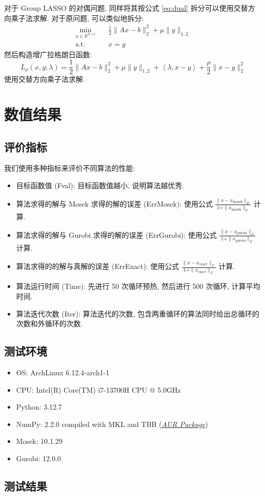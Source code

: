 \documentclass{article}
\begin{document}
对于 Group LASSO 的对偶问题, 同样将其按公式 \ref{eq:dual} 拆分可以使用交替方向乘子法求解. 对于原问题, 可以类似地拆分:
\begin{equation*}
    \begin{aligned}
        \min_{x \in \mathbb{R}^{n\times l}}\quad &\frac{1}{2} \|Ax - b\|_2^2 +
        \mu \|y\|_{1,2}\\
        \text{s.t.}\quad & x=y
    \end{aligned}
\end{equation*}
然后构造增广拉格朗日函数:
\begin{equation*}
    L_\rho(x, y; \lambda) = \frac{1}{2} \|Ax - b\|_2^2 + \mu \|y\|_{1,2} + \left<\lambda, x - y\right> + \frac{\rho}{2}\|x - y\|_2^2
\end{equation*}
使用交替方向乘子法求解.

\section{数值结果}

\subsection{评价指标}
我们使用多种指标来评价不同算法的性能:
\begin{itemize}
    \item 目标函数值 (Fval): 目标函数值越小, 说明算法越优秀.
    \item 算法求得的解与 Mosek 求得的解的误差 (ErrMosek): 使用公式 $\frac{\|x - x_{\text{mosek}}\|_F}{1+\|x_{\text{mosek}}\|_F}$ 计算.
    \item 算法求得的解与 Gurobi 求得的解的误差 (ErrGurobi): 使用公式 $\frac{\|x - x_{\text{gurobi}}\|_F}{1+\|x_{\text{gurobi}}\|_F}$ 计算.
    \item 算法求得的的解与真解的误差 (ErrExact): 使用公式 $\frac{\|x - x_{\text{exact}}\|_F}{1+\|x_{\text{exact}}\|_F}$ 计算.
    \item 算法运行时间 (Time): 先进行 50 次循环预热, 然后进行 500 次循环, 计算平均时间.
    \item 算法迭代次数 (Iter): 算法迭代的次数, 包含两重循环的算法同时给出总循环的次数和外循环的次数.
\end{itemize}

\subsection{测试环境}

\begin{itemize}
    \item OS: ArchLinux 6.12.4-arch1-1
    \item CPU: Intel(R) Core(TM) i7-13700H CPU @ 5.0GHz
    \item Python: 3.12.7
    \item NumPy: 2.2.0 compiled with MKL and TBB (\href{https://aur.archlinux.org/packages/python-numpy-mkl-tbb}{\textit{AUR Package}})
    \item Mosek: 10.1.29
    \item Gurobi: 12.0.0
\end{itemize}

\subsection{测试结果}
\end{document}
